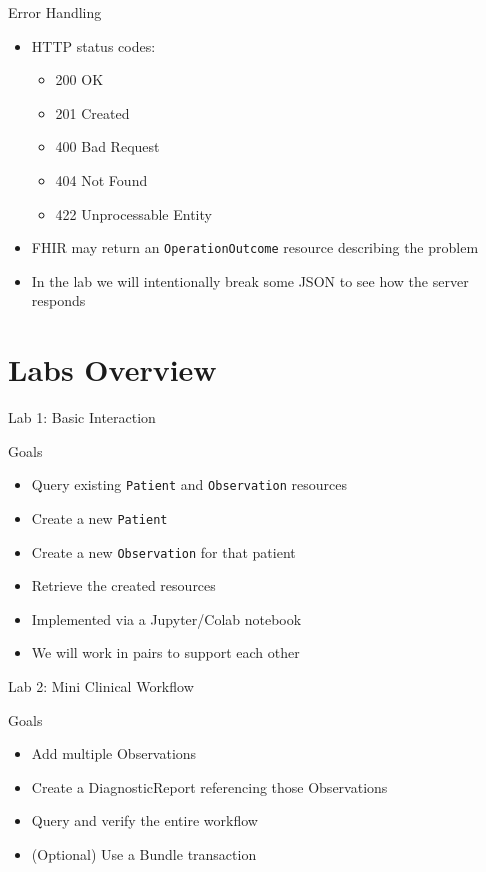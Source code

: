 \documentclass[aspectratio=1610]{beamer}
\begin{document}
	\begin{frame}{Error Handling}
		\begin{itemize}
			\item HTTP status codes:
			\begin{itemize}
				\item 200 OK
				\item 201 Created
				\item 400 Bad Request
				\item 404 Not Found
				\item 422 Unprocessable Entity
			\end{itemize}
			\item FHIR may return an \texttt{OperationOutcome} resource describing the problem
			\item In the lab we will intentionally break some JSON to see how the server responds
		\end{itemize}
	\end{frame}
	
	\section{Labs Overview}
	
	\begin{frame}{Lab 1: Basic Interaction}
		\begin{block}{Goals}
			\begin{itemize}
				\item Query existing \texttt{Patient} and \texttt{Observation} resources
				\item Create a new \texttt{Patient}
				\item Create a new \texttt{Observation} for that patient
				\item Retrieve the created resources
			\end{itemize}
		\end{block}
		\begin{itemize}
			\item Implemented via a Jupyter/Colab notebook
			\item We will work in pairs to support each other
		\end{itemize}
	\end{frame}
	
	\begin{frame}{Lab 2: Mini Clinical Workflow}
		\begin{block}{Goals}
			\begin{itemize}
				\item Add multiple Observations
				\item Create a DiagnosticReport referencing those Observations
				\item Query and verify the entire workflow
				\item (Optional) Use a Bundle transaction
			\end{itemize}
		\end{block}
	\end{frame}
	
\end{document}
